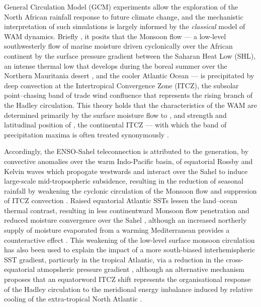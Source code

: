 \documentclass[a4paper]{article}
\begin{document}
General Circulation Model (GCM) experiments allow the exploration of the North African rainfall response to future climate change, and the mechanistic interpretation of such simulations is largely informed by the \emph{classical} model of WAM dynamics.
Briefly \parencite[see][for comprehensive descriptions]{sultan2000abrupt, sultan2003west2, ramel2006northward}, it posits that the Monsoon flow --- a low-level southwesterly flow of marine moisture driven cyclonically over the African continent by the surface pressure gradient between the Saharan Heat Low (SHL), an intense thermal low that develops during the boreal summer over the Northern Mauritania desert \parencite{engelstaedter2015saharan}, and the cooler Atlantic Ocean \parencite{hall2006dynamics, grams2010atlantic} --- is precipitated by deep convection at the Intertropical Convergence Zone (ITCZ), the subsolar point--chasing band of trade wind confluence that represents the rising branch of the Hadley circulation.
This theory holds that the characteristics of the WAM are determined primarily by the surface moisture flow to \parencite{folland1986sahel, sultan2003west1, hagos2007dynamics}, and strength and latitudinal position of \parencite{janicot1998west, damato1998characteristics, sultan2003west1}, the continental ITCZ --- with which the band of precipitation maxima is often treated synonymously \parencite[e.g.][]{shinoda1994tropical, ba1995satellite, ramel2006northward, braconnot2007results, peyrille2016annual}.

Accordingly, the ENSO-Sahel teleconnection is attributed to the generation, by convective anomalies over the warm Indo-Pacific basin, of equatorial Rossby and Kelvin waves which propogate westwards and interact over the Sahel to induce large-scale mid-tropospheric subsidence, resulting in the reduction of seasonal rainfall by weakening the cyclonic circulation of the Monsoon flow and suppresion of ITCZ convection \parencite{shinoda1994tropical, goddard1999importance, rowell2001teleconnections, janicot2001intra, lu2005oceanic}.
Raised equatorial Atlantic SSTs lessen the land--ocean thermal contrast, resulting in less continentward Monsoon flow penetration and reduced moisture convergence over the Sahel \parencite{vizy2002development, giannini2003oceanic, losada2010multi}, although an increased northerly supply of moisture evaporated from a warming Mediterranean provides a counteractive effect \parencite{rowell2003impact, gaetani2010influence}.
This weakening of the low-level surface monsoon circulation has also been used to explain the impact of a more south-biased interhemispheric SST gradient, particurly in the tropical Atlantic, via a reduction in the cross-equatorial atmopsheric pressure gradient \parencite{lu2005oceanic, chung2007relationship, biasutti2006robust, zhang2006impact}, although an alternative mechanism proposes that an equatorword ITCZ shift represents the organisational response of the Hadley circulation to the meridional energy imbalance induced by relative cooling of the extra-tropical North Atlantic \parencite{broccoli2006response, hwang2013anthropogenic}. 
\end{document}

